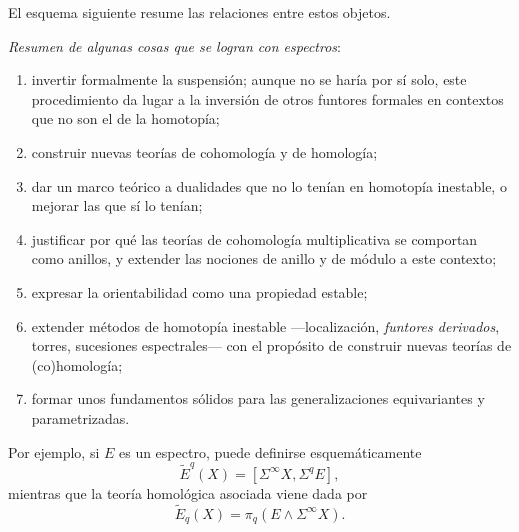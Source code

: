El esquema siguiente resume las relaciones entre estos objetos.
\begin{center}
\end{center}

\vspace{0.5em}
\emph{Resumen de algunas cosas que se logran con espectros}:
\begin{enumerate}
\item invertir formalmente la suspensión; aunque no se haría por sí solo, este procedimiento da lugar a la inversión de otros funtores formales en contextos que no son el de la homotopía;
\item construir nuevas teorías de cohomología y de homología;
\item dar un marco teórico a dualidades que no lo tenían en homotopía inestable, o mejorar las que sí lo tenían;
\item justificar por qué las teorías de cohomología multiplicativa se comportan como anillos, y extender las nociones de anillo y de módulo a este contexto;
\item expresar la orientabilidad como una propiedad estable;
\item extender métodos de homotopía inestable ---localización, \emph{funtores derivados}, torres, sucesiones espectrales--- con el propósito de construir nuevas teorías de (co)homología;
\item formar unos fundamentos sólidos para las generalizaciones equivariantes y parametrizadas.
\end{enumerate}

Por ejemplo, si \(E\) es un espectro, puede definirse esquemáticamente
\[
\widetilde E^q(X)=[\Sigma^\infty X,\Sigma^qE],
\]
mientras que la teoría homológica asociada viene dada por
\[
\widetilde E_q(X)=\pi_q(E\wedge\Sigma^\infty X).
\]

